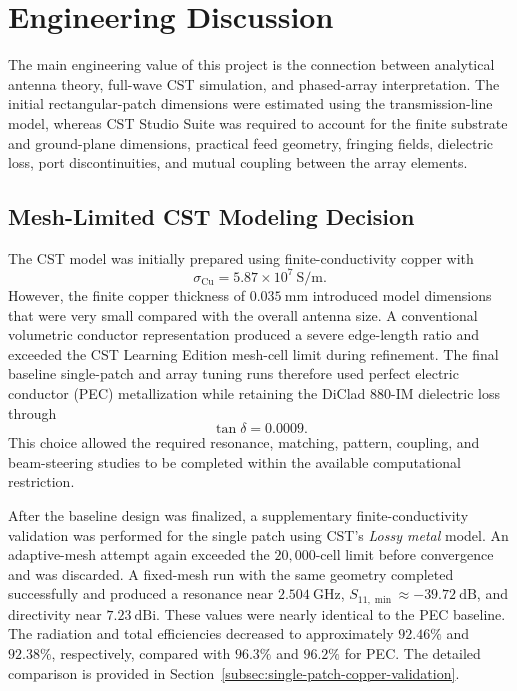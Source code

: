 \section{Engineering Discussion}
\label{sec:engineering-discussion}

The main engineering value of this project is the connection between analytical antenna theory,
full-wave CST simulation, and phased-array interpretation. The initial rectangular-patch dimensions
were estimated using the transmission-line model, whereas CST Studio Suite was required to account
for the finite substrate and ground-plane dimensions, practical feed geometry, fringing fields,
dielectric loss, port discontinuities, and mutual coupling between the array elements.

\subsection{Mesh-Limited CST Modeling Decision}

The CST model was initially prepared using finite-conductivity copper with
\[
\sigma_{\mathrm{Cu}}=5.87\times10^7~\mathrm{S/m}.
\]
However, the finite copper thickness of \(0.035~\mathrm{mm}\) introduced model dimensions that were
very small compared with the overall antenna size. A conventional volumetric conductor representation
produced a severe edge-length ratio and exceeded the CST Learning Edition mesh-cell limit during
refinement. The final baseline single-patch and array tuning runs therefore used perfect electric
conductor (PEC) metallization while retaining the DiClad 880-IM dielectric loss through
\[
\tan\delta=0.0009.
\]
This choice allowed the required resonance, matching, pattern, coupling, and beam-steering studies to
be completed within the available computational restriction.

After the baseline design was finalized, a supplementary finite-conductivity validation was performed
for the single patch using CST's \emph{Lossy metal} model. An adaptive-mesh attempt again exceeded the
\(20{,}000\)-cell limit before convergence and was discarded. A fixed-mesh run with the same geometry
completed successfully and produced a resonance near \(2.504~\mathrm{GHz}\),
\(S_{11,\min}\approx-39.72~\mathrm{dB}\), and directivity near \(7.23~\mathrm{dBi}\). These values
were nearly identical to the PEC baseline. The radiation and total efficiencies decreased to
approximately \(92.46\%\) and \(92.38\%\), respectively, compared with \(96.3\%\) and \(96.2\%\)
for PEC. The detailed comparison is provided in Section~\ref{subsec:single-patch-copper-validation}.

